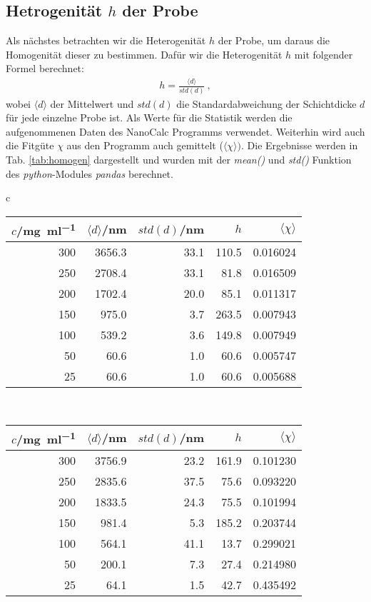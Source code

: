\subsection{Hetrogenität $h$ der Probe}
\label{sub:fitguete}

Als nächstes betrachten wir die Heterogenität $h$ der Probe, um daraus die Homogenität dieser zu bestimmen. Dafür wir die Heterogenität $h$ mit folgender Formel berechnet:
\begin{gather}
	\boxed{h = \frac{\langle d \rangle}{std(d)}}~, 
\end{gather}
wobei $\langle d \rangle$ der Mittelwert und $std(d)$ die Standardabweichung der Schichtdicke $d$ für jede einzelne Probe ist. Als Werte für die Statistik werden die aufgenommenen Daten des NanoCalc Programms verwendet. Weiterhin wird auch die Fitgüte $\chi$ aus den Programm auch gemittelt ($\langle\chi\rangle)$. Die Ergebnisse werden in Tab. \ref{tab:homogen} dargestellt und wurden mit der \textit{mean()} und \textit{std()} Funktion des \textit{python}-Modules \textit{pandas} berechnet. 
\begin{center}
	\captionsetup{type=table}
	\begin{tabular}{c}	
		\begin{tabular}{r | r r r | r}
			$c$/\si{\milli\gram\per\milli\litre} & $\langle d \rangle$/\si{\nano\metre} & $std(d)$/\si{\nano\metre} & $h$ & $\langle \chi \rangle$ \\[0,1cm]
			\hline
			300 & 3656.3 & 33.1 & 110.5 & 0.016024 \\
			250 & 2708.4 & 33.1 &  81.8 & 0.016509 \\
			200 & 1702.4 & 20.0 &  85.1 & 0.011317 \\
			150 &  975.0 &  3.7 & 263.5 & 0.007943 \\
			100 &  539.2 &  3.6 & 149.8 & 0.007949 \\
			 50 &   60.6 &  1.0 &  60.6 & 0.005747 \\
			 25 &   60.6 &  1.0 &  60.6 & 0.005688 \\
		\end{tabular} \\[2cm]
		\begin{tabular}{r | r r r | r}
			$c$/\si{\milli\gram\per\milli\litre} & $\langle d \rangle$/\si{\nano\metre} & $std(d)$/\si{\nano\metre} & $h$ & $\langle \chi \rangle$ \\[0,1cm]
			\hline
			300 & 3756.9 & 23.2 & 161.9 & 0.101230 \\
			250 & 2835.6 & 37.5 &  75.6 & 0.093220 \\
			200 & 1833.5 & 24.3 &  75.5 & 0.101994 \\
			150 &  981.4 &  5.3 & 185.2 & 0.203744 \\
			100 &  564.1 & 41.1 &  13.7 & 0.299021 \\
			 50 &  200.1 &  7.3 &  27.4 & 0.214980 \\
			 25 &   64.1 &  1.5 &  42.7 & 0.435492 \\
		\end{tabular} \\
	\end{tabular}
	\label{tab:homogen}
\end{center}
